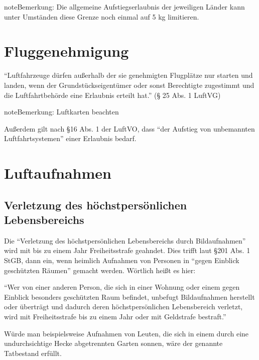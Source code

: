 \documentclass[letterpaper,11pt,ngerman]{andi}
\begin{document}
\begin{notice}{note}{Bemerkung:}
Die allgemeine Aufstiegserlaubnis der jeweiligen Länder kann unter Umständen diese Grenze noch einmal auf 5 kg limitieren.
\end{notice}


\section{Fluggenehmigung}
\label{included_projects/rechtliches/RECHTLICHES_SPEC/content:fluggenehmigung}
``Luftfahrzeuge dürfen außerhalb der sie genehmigten Flugplätze nur starten und landen, wenn der Grundstückseigentümer oder sonst Berechtigte zugestimmt und die Luftfahrtbehörde eine Erlaubnis erteilt hat.'' (\S{} 25 Abs. 1 LuftVG)

\begin{notice}{note}{Bemerkung:}
Luftkarten beachten
\end{notice}

Außerdem gilt nach \S{}16 Abs. 1 der LuftVO, dass ``der Aufstieg von unbemannten Luftfahrtsystemen'' einer Erlaubnis bedarf.


\section{Luftaufnahmen}
\label{included_projects/rechtliches/RECHTLICHES_SPEC/content:luftaufnahmen}

\subsection{Verletzung des höchstpersönlichen Lebensbereichs}
\label{included_projects/rechtliches/RECHTLICHES_SPEC/content:verletzung-des-hochstpersonlichen-lebensbereichs}
Die ``Verletzung des höchstpersönlichen Lebensbereichs durch Bildaufnahmen'' wird mit bis zu einem Jahr Freiheitsstrafe geahndet. \cite{lebensbereich} \cite{heimlich} Dies trifft laut \S{}201 Abs. 1 StGB, dann ein, wenn heimlich Aufnahmen von Personen in ``gegen Einblick geschützten Räumen'' gemacht werden. Wörtlich heißt es hier:

``Wer von einer anderen Person, die sich in einer Wohnung oder einem gegen Einblick besonders geschützten Raum befindet, unbefugt Bildaufnahmen herstellt oder überträgt und dadurch deren höchstpersönlichen Lebensbereich verletzt, wird mit Freiheitsstrafe bis zu einem Jahr oder mit Geldstrafe bestraft.''

Würde man beispielsweise Aufnahmen von Leuten, die sich in einem durch eine undurchsichtige Hecke abgetrennten Garten sonnen, wäre der genannte Tatbestand erfüllt.
\end{document}
